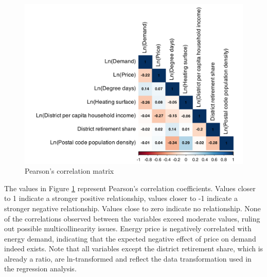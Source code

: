 \documentclass[12pt,twoside]{reedthesis}
\begin{document}
\newpage
\begin{figure}

{\centering \includegraphics[width=0.9\linewidth]{figure/correlation_matrix} 

}

\caption{Pearson’s correlation matrix}\label{fig:correlation-plot}
\end{figure}
\noindent
The values in Figure \ref{fig:correlation-plot} represent Pearson's correlation coefficients. Values closer to 1 indicate a stronger positive relationship, values closer to -1 indicate a stronger negative relationship. Values close to zero indicate no relationship. None of the correlations observed between the variables exceed moderate values, ruling out possible multicollinearity issues. Energy price is negatively correlated with energy demand, indicating that the expected negative effect of price on demand indeed exists. Note that all variables except the district retirement share, which is already a ratio, are ln-transformed and reflect the data transformation used in the regression analysis.
\end{document}
